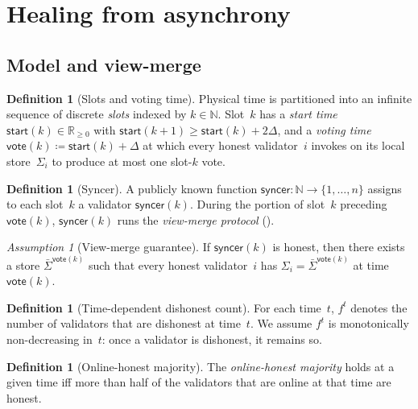 \ifx\litemode\undefined\documentclass{article}\fi
\newcommand{\syncer}{\mathsf{syncer}}
\newcommand{\start}{\mathsf{start}}
\newcommand{\vote}{\mathsf{vote}}
\newcommand{\comm}[1]{\bar{#1}}
\theoremstyle{plain}
\theoremstyle{definition}
\newtheorem{definition}[theorem]{Definition}
\theoremstyle{remark}
\newtheorem{assumption}[theorem]{Assumption}
\newcommand{\OHM}{online-honest majority\xspace}
\begin{document}
\section{Healing from asynchrony}\label{sec:healing}

\subsection{Model and view-merge}\label{rev:sec:healing-model}

\begin{definition}[Slots and voting time]\label{rev:def:slots}
Physical time is partitioned into an infinite sequence of discrete \emph{slots} indexed by $k \in \mathbb{N}$.
Slot~$k$ has a \emph{start time} $\start(k) \in \mathbb{R}_{\geq 0}$ with $\start(k+1) \geq \start(k) + 2\Delta$, and a \emph{voting time} $\vote(k) \coloneqq \start(k) + \Delta$ at which every honest validator~$i$ invokes  on its local store~$\Sigma_i$ to produce at most one slot-$k$ vote.
\end{definition}

\begin{definition}[Syncer]\label{rev:def:syncer}
A publicly known function $\syncer \colon \mathbb{N} \to \{1, \ldots, n\}$ assigns to each slot~$k$ a validator $\syncer(k)$.
During the portion of slot~$k$ preceding $\vote(k)$, $\syncer(k)$ runs the \emph{view-merge protocol} ().
\end{definition}

\begin{assumption}[View-merge guarantee]\label{rev:ass:view-merge}
If $\syncer(k)$ is honest, then there exists a store $\comm{\Sigma}^{\vote(k)}$ such that every honest validator~$i$ has $\Sigma_i = \comm{\Sigma}^{\vote(k)}$ at time $\vote(k)$.
\end{assumption}

\begin{definition}[Time-dependent dishonest count]\label{rev:def:f-t}
For each time~$t$, $f^t$ denotes the number of validators that are dishonest at time~$t$. We assume $f^t$ is monotonically non-decreasing in~$t$: once a validator is dishonest, it remains so.
\end{definition}

\begin{definition}[Online-honest majority]\label{rev:def:online-honest-majority}
The \emph{\OHM} holds at a given time iff more than half of the validators that are online at that time are honest.
\end{definition}
\end{document}
